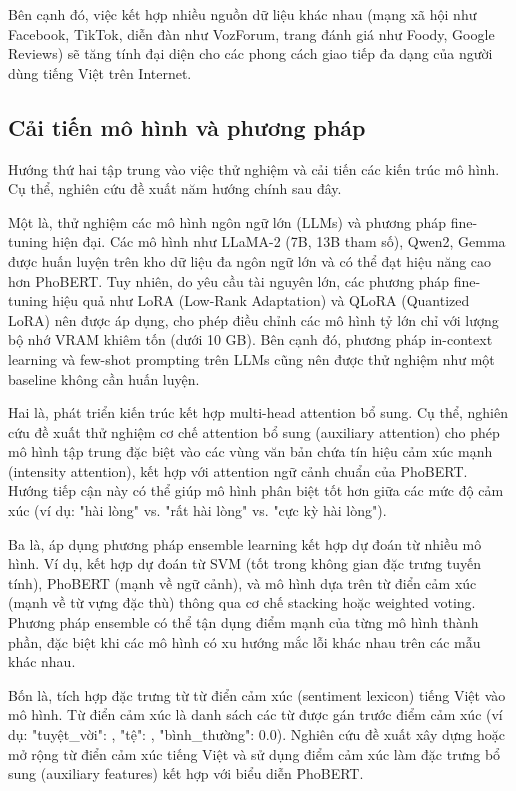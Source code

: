 \documentclass[14pt, a4paper]{report}
\begin{document}
Bên cạnh đó, việc kết hợp nhiều nguồn dữ liệu khác nhau (mạng xã hội như Facebook, TikTok, diễn đàn như VozForum, trang đánh giá như Foody, Google Reviews) sẽ tăng tính đại diện cho các phong cách giao tiếp đa dạng của người dùng tiếng Việt trên Internet.


\subsection{Cải tiến mô hình và phương pháp}


Hướng thứ hai tập trung vào việc thử nghiệm và cải tiến các kiến trúc mô hình. Cụ thể, nghiên cứu đề xuất năm hướng chính sau đây.


Một là, thử nghiệm các mô hình ngôn ngữ lớn (LLMs) và phương pháp fine-tuning hiện đại. Các mô hình như LLaMA-2 (7B, 13B tham số), Qwen2, Gemma được huấn luyện trên kho dữ liệu đa ngôn ngữ lớn và có thể đạt hiệu năng cao hơn PhoBERT. Tuy nhiên, do yêu cầu tài nguyên lớn, các phương pháp fine-tuning hiệu quả như LoRA (Low-Rank Adaptation) và QLoRA (Quantized LoRA) nên được áp dụng, cho phép điều chỉnh các mô hình tỷ lớn chỉ với lượng bộ nhớ VRAM khiêm tốn (dưới 10 GB). Bên cạnh đó, phương pháp in-context learning và few-shot prompting trên LLMs cũng nên được thử nghiệm như một baseline không cần huấn luyện.


Hai là, phát triển kiến trúc kết hợp multi-head attention bổ sung. Cụ thể, nghiên cứu đề xuất thử nghiệm cơ chế attention bổ sung (auxiliary attention) cho phép mô hình tập trung đặc biệt vào các vùng văn bản chứa tín hiệu cảm xúc mạnh (intensity attention), kết hợp với attention ngữ cảnh chuẩn của PhoBERT. Hướng tiếp cận này có thể giúp mô hình phân biệt tốt hơn giữa các mức độ cảm xúc (ví dụ: "hài lòng" vs. "rất hài lòng" vs. "cực kỳ hài lòng").


Ba là, áp dụng phương pháp ensemble learning kết hợp dự đoán từ nhiều mô hình. Ví dụ, kết hợp dự đoán từ SVM (tốt trong không gian đặc trưng tuyến tính), PhoBERT (mạnh về ngữ cảnh), và mô hình dựa trên từ điển cảm xúc (mạnh về từ vựng đặc thù) thông qua cơ chế stacking hoặc weighted voting. Phương pháp ensemble có thể tận dụng điểm mạnh của từng mô hình thành phần, đặc biệt khi các mô hình có xu hướng mắc lỗi khác nhau trên các mẫu khác nhau.


Bốn là, tích hợp đặc trưng từ từ điển cảm xúc (sentiment lexicon) tiếng Việt vào mô hình. Từ điển cảm xúc là danh sách các từ được gán trước điểm cảm xúc (ví dụ: "tuyệt\_vời": , "tệ": , "bình\_thường": 0.0). Nghiên cứu đề xuất xây dựng hoặc mở rộng từ điển cảm xúc tiếng Việt và sử dụng điểm cảm xúc làm đặc trưng bổ sung (auxiliary features) kết hợp với biểu diễn PhoBERT.
\end{document}

